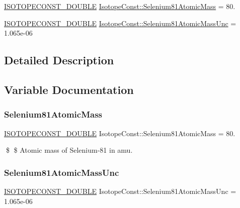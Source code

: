 \begin{DoxyCompactItemize}
\item 
\mbox{\hyperlink{group___isotope_const-_macros_ga8f45a7272ce02c0b4c65c44636ed719a}{I\+S\+O\+T\+O\+P\+E\+C\+O\+N\+S\+T\+\_\+\+D\+O\+U\+B\+LE}} \mbox{\hyperlink{group___isotope_const-_selenium-_se81_ga1bde6b110abeb4b8472e7ab410d0091a}{Isotope\+Const\+::\+Selenium81\+Atomic\+Mass}} = 80.
\item 
\mbox{\hyperlink{group___isotope_const-_macros_ga8f45a7272ce02c0b4c65c44636ed719a}{I\+S\+O\+T\+O\+P\+E\+C\+O\+N\+S\+T\+\_\+\+D\+O\+U\+B\+LE}} \mbox{\hyperlink{group___isotope_const-_selenium-_se81_ga6b38bd33440644e6efc27dd0ee881436}{Isotope\+Const\+::\+Selenium81\+Atomic\+Mass\+Unc}} = 1.\+065e-\/06
\end{DoxyCompactItemize}


\subsection{Detailed Description}


\subsection{Variable Documentation}
\mbox{\label{group___isotope_const-_selenium-_se81_ga1bde6b110abeb4b8472e7ab410d0091a}} 
\subsubsection{\texorpdfstring{Selenium81\+Atomic\+Mass}{Selenium81AtomicMass}}
{\footnotesize\ttfamily \mbox{\hyperlink{group___isotope_const-_macros_ga8f45a7272ce02c0b4c65c44636ed719a}{I\+S\+O\+T\+O\+P\+E\+C\+O\+N\+S\+T\+\_\+\+D\+O\+U\+B\+LE}} Isotope\+Const\+::\+Selenium81\+Atomic\+Mass = 80.}

\$ \$ Atomic mass of Selenium-\/81 in amu. \mbox{\label{group___isotope_const-_selenium-_se81_ga6b38bd33440644e6efc27dd0ee881436}} 
\subsubsection{\texorpdfstring{Selenium81\+Atomic\+Mass\+Unc}{Selenium81AtomicMassUnc}}
{\footnotesize\ttfamily \mbox{\hyperlink{group___isotope_const-_macros_ga8f45a7272ce02c0b4c65c44636ed719a}{I\+S\+O\+T\+O\+P\+E\+C\+O\+N\+S\+T\+\_\+\+D\+O\+U\+B\+LE}} Isotope\+Const\+::\+Selenium81\+Atomic\+Mass\+Unc = 1.\+065e-\/06}


